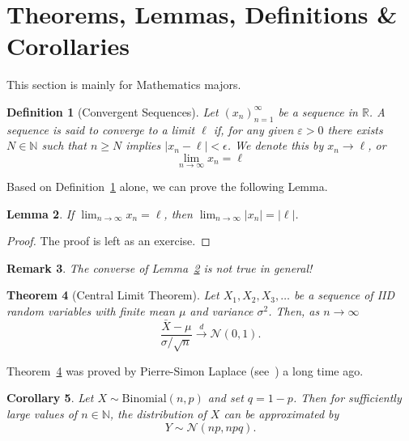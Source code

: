 \documentclass{article}
\newtheorem{definition}{Definition}[section]
\newtheorem{theorem}[definition]{Theorem}
\newtheorem{lemma}[definition]{Lemma}
\newtheorem{corollary}[definition]{Corollary}
\newtheorem{remark}[definition]{Remark}
\begin{document}
    \section{Theorems, Lemmas, Definitions \& Corollaries}
        This section is mainly for Mathematics majors.
        \begin{definition}[Convergent Sequences]\label{definition: convergent sequences}
            Let $(x_{n})_{n=1}^{\infty}$ be a sequence in $\mathbb{R}$. A sequence is said to converge to a limit $\ell$ if, for any given $\varepsilon > 0$ there exists $N \in \mathbb{N}$ such that $n \geq N$ implies $|x_{n} - \ell| < \epsilon$. We denote this by $x_{n} \to \ell$, or
            \begin{equation}
                \lim_{n\to\infty} x_{n} = \ell
            \end{equation}
        \end{definition}
        Based on Definition~\ref{definition: convergent sequences} alone, we can prove the following Lemma.
        \begin{lemma}\label{lemma: property of convergent sequences}
            If $\lim_{n\to\infty} x_{n} = \ell$, then $\lim_{n\to\infty} |x_{n}| = |\ell|$.
        \end{lemma}
        \begin{proof}
            The proof is left as an exercise.
        \end{proof}
        \begin{remark}
            The converse of Lemma~\ref{lemma: property of convergent sequences} is not true in general!
        \end{remark}
        \begin{theorem}[Central Limit Theorem]\label{theorem: central limit theorem}
            Let $X_{1}, X_{2}, X_{3}, \dots$ be a sequence of IID random variables with finite mean $\mu$ and variance $\sigma^{2}$. Then, as $n \to \infty$
            \begin{equation}
                \frac{\bar{X} - \mu}{\sigma/\sqrt{n}} \overset{d}{\longrightarrow} \mathcal{N}(0, 1).
            \end{equation}
        \end{theorem}
        Theorem~\ref{theorem: central limit theorem} was proved by Pierre-Simon Laplace (see~\cite{pierre-simon-laplace-clt}) a long time ago.
        \begin{corollary}
            Let $X \sim \text{Binomial}(n, p)$ and set $q = 1-p$. Then for sufficiently large values of $n \in \mathbb{N}$, the distribution of $X$ can be approximated by
            \begin{equation}
                Y \sim \mathcal{N}(np, npq).
            \end{equation}
        \end{corollary}
    \newpage
\end{document}
